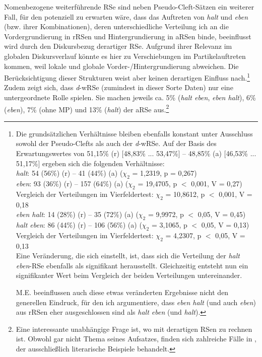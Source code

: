 \noindent
Nomenbezogene weiterführende RSe sind neben Pseudo-Cleft-Sätzen ein wei\-terer Fall, für den potenziell zu erwarten wäre, dass das Auftreten von \textit{halt} und \textit{eben} (bzw. ihrer Kombinationen), deren unterschiedliche Verteilung ich an die Vordergrundierung in rRSen und Hintergrundierung in aRSen binde, beeinflusst wird durch den Diskursbezug derartiger RSe. Aufgrund ihrer Relevanz im glo\-balen Diskursverlauf könnte es hier zu Verschiebungen im Partikelauftreten kommen, weil lokale und globale Vorder-/Hintergrundierung abweichen. Die Berücksichtigung dieser Strukturen weist aber keinen derartigen Einfluss nach.\footnote{Die grundsätzlichen Verhältnisse bleiben ebenfalls konstant unter Ausschluss sowohl der Pseudo-Clefts als auch der \textit{d}-wRSe. Auf der Basis des Erwartungswertes von 51,15\% (r) $[$48,83\% ... 53,47\%$]$ – 48,85\% (a) $[$46,53\% ... 51,17\%$]$ ergeben sich die folgenden Verhältnisse:\\

\noindent
\textit{halt}: 54 (56\%) (r) – 41 (44\%) (a) ($\chi_{2}$ = 1,2319, p = 0,267)\\
\textit{eben}: 93 (36\%) (r) – 157 (64\%) (a) ($\chi_{2}$ = 19,4705, p $<$ 0,001, V = 0,27)\\
Vergleich der Verteilungen im Vierfeldertest: $\chi_{2}$ = 10,8612, p $<$ 0,001, V = 0,18\\
\textit{eben halt}: 14 (28\%) (r) – 35 (72\%) (a) ($\chi_{2}$ = 9,9972, p $<$ 0,05, V = 0,45)\\
\textit{halt eben}: 86 (44\%) (r) – 106 (56\%) (a) ($\chi_{2}$ = 3,1065, p $<$ 0,05, V = 0,13)\\
Vergleich der Verteilungen im Vierfeldertest: $\chi_{2}$ = 4,2307, p $<$ 0,05, V = 0,13\\
\noindent
Eine Veränderung, die sich einstellt, ist, dass sich die Verteilung der \textit{halt eben}-RSe ebenfalls als signifikant herausstellt. Gleichzeitig entsteht nun ein signifikanter Wert beim Vergleich der beiden Verteilungen untereinander.

M.E. beeinflussen auch diese etwas veränderten Ergebnisse nicht den generellen Eindruck, für den ich argumentiere, dass \textit{eben halt} (und auch \textit{eben}) aus rRSen eher ausgeschlossen sind als \textit{halt eben} (und \textit{halt}).


} Zudem zeigt sich, dass \textit{d}-wRSe (zumindest in dieser Sorte Daten) nur eine untergeordnete Rolle spielen. Sie machen jeweils ca. 5\% (\textit{halt eben}, \textit{eben halt}), 6\% (\textit{eben}), 7\% (ohne MP) und 13\% (\textit{halt}) der aRSe aus.\footnote{Eine interessante unabhängige Frage ist, wo mit derartigen RSen zu rechnen ist. Obwohl gar nicht Thema seines Aufsatzes, finden sich zahlreiche Fälle in \citet{Mikame1998}, der ausschließlich literarische Beispiele behandelt.}


	





